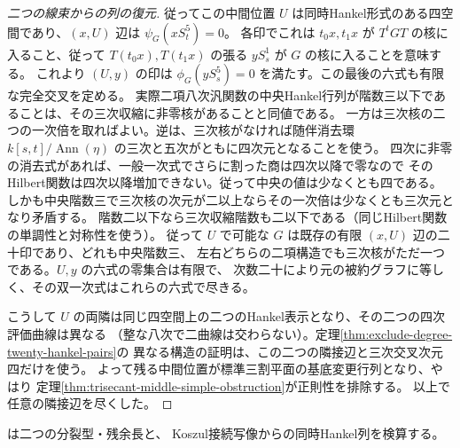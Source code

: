 \begin{proof}[二つの線束からの列の復元]
従ってこの中間位置 $U$ は同時Hankel形式のある四空間であり、$(x,U)$ 辺は $\psi_G(x S_t^5)=0$。
各印でこれは $t_0x,t_1x$ が $T^t G T$ の核に入ること、従って
$T(t_0x),T(t_1x)$ の張る $y S_s^1$ が $G$ の核に入ることを意味する。
これより $(U,y)$ の印は $\phi_G(y S_s^5)=0$ を満たす。この最後の六式も有限な完全交叉を定める。
実際二項八次汎関数の中央Hankel行列が階数三以下であることは、その三次収縮に非零核があることと同値である。
一方は三次核の二つの一次倍を取ればよい。逆は、三次核がなければ随伴消去環
$k[s,t]/\operatorname{Ann}(\eta)$ の三次と五次がともに四次元となることを使う。
四次に非零の消去式があれば、一般一次式でさらに割った商は四次以降で零なので
そのHilbert関数は四次以降増加できない。従って中央の値は少なくとも四である。
しかも中央階数三で三次核の次元が二以上ならその一次倍は少なくとも三次元となり矛盾する。
階数二以下なら三次収縮階数も二以下である（同じHilbert関数の単調性と対称性を使う）。
従って $U$ で可能な $G$ は既存の有限 $(x,U)$ 辺の二十印であり、どれも中央階数三、
左右どちらの二項構造でも三次核がただ一つである。$U,y$ の六式の零集合は有限で、
次数二十により元の被約グラフに等しく、その双一次式はこれらの六式で尽きる。

こうして $U$ の両隣は同じ四空間上の二つのHankel表示となり、その二つの四次評価曲線は異なる
（整な八次で二曲線は交わらない）。定理\ref{thm:exclude-degree-twenty-hankel-pairs}の
異なる構造の証明は、この二つの隣接辺と三次交叉次元四だけを使う。
よって残る中間位置が標準三割平面の基底変更行列となり、やはり
定理\ref{thm:trisecant-middle-simple-obstruction}が正則性を排除する。
以上で任意の隣接辺を尽くした。
\end{proof}
 は二つの分裂型・残余長と、
Koszul接続写像からの同時Hankel列を検算する。
